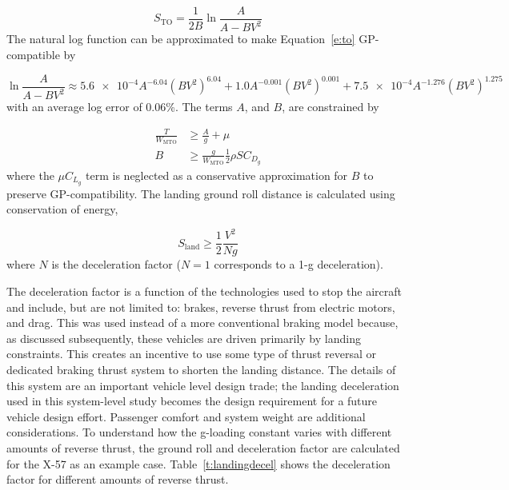 \documentclass[]{aiaa-tc}%
\begin{document}
\begin{equation}
    \label{e:to}
    S_{\mathrm{TO}} = \frac{1}{2B} \ln{\frac{A}{A-BV^2}} 
\end{equation}
The natural log function can be approximated to make Equation~\ref{e:to} GP-compatible by 

\begin{equation}
    \ln{\frac{A}{A-BV^2}} \approx \num{5.6e-4} A^{-6.04} (BV^2)^{6.04} + 1.0 A^{-0.001} (BV^2)^{0.001} + \num{7.5e-4} A^{-1.276} (BV^2)^{1.275}
\end{equation}
with an average log error of 0.06\%.  The terms $A$, and $B$, are constrained by

\begin{align}
    \frac{T}{W_{\mathrm{MTO}}} &\geq \frac{A}{g} + \mu \\
    B &\geq \frac{g}{W_{\mathrm{MTO}}} \frac{1}{2} \rho S C_{D_g}
\end{align}
where the $\mu C_{L_g}$ term is neglected as a conservative approximation for $B$ to preserve GP-compatibility. The landing ground roll distance is calculated using conservation of energy, 

\begin{equation}
    \label{e:sgr}
    S_{\mathrm{land}} \geq \frac{1}{2} \frac{V^2}{Ng} 
\end{equation}
where $N$ is the deceleration factor ($N=1$ corresponds to a 1-g deceleration). 

The deceleration factor is a function of the technologies used to stop the aircraft and include, but are not limited to: brakes, reverse thrust from electric motors, and drag.  This was used instead of a more conventional braking model because, as discussed subsequently, these vehicles are driven primarily by landing constraints.  This creates an incentive to use some type of thrust reversal or dedicated braking thrust system to shorten the landing distance.  The details of this system are an important vehicle level design trade; the landing deceleration used in this system-level study becomes the design requirement for a future vehicle design effort. Passenger comfort and system weight are additional considerations.  
To understand how the g-loading constant varies with different amounts of reverse thrust, the ground roll and deceleration factor are calculated for the X-57 as an example case. 
Table~\ref{t:landingdecel} shows the deceleration factor for different amounts of reverse thrust. 
\end{document}
